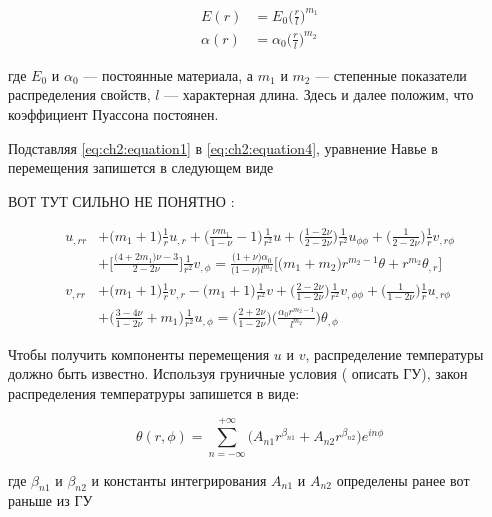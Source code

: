 \begin{equation}
	\label{eq:ch2:equation4}
	\begin{split}
		E(r) &= E_0 \big ( \frac{r}{l} \big) ^ {m_1} \\
		\alpha (r) &= \alpha_0 \big ( \frac{r}{l} \big) ^{ m_2}
	\end{split}
\end{equation}

где \(E_0\) и \(\alpha_0 \) --- постоянные материала, а \(m_1\) и \(m_2\) --- степенные показатели распределения свойств, \(l\) --- характерная длина. Здесь и далее положим,
что коэффициент Пуассона постоянен.

Подставляя \cref{eq:ch2:equation1} в \cref{eq:ch2:equation4}, уравнение Навье в перемещения запишется в следующем виде {\color{red} ВОТ ТУТ СИЛЬНО НЕ ПОНЯТНО :

\begin{equation}
	\label{eq:ch2:equation5}
	\begin{split}
		u_{,rr} &+ \big ( m_1+1\big ) \frac{1}{r} u_{,r} + \big ( \frac{\nu m_1}{1-\nu} -1 \big ) \frac{1}{r^2} u + \big ( \frac{1-2\nu}{2-2\nu} \big) \frac{1}{r^2} u_{\phi \phi} + \big ( \frac{1}{2-2\nu}\big ) \frac{1}{r} v_{,r \phi} \\
		&+ \big [ \frac{\big ( 4+2 m_1\big ) \nu -3 }{2-2\nu} \big ] \frac{1}{r^2} v_{, \phi} = \frac{\big ( 1+\nu\big ) \alpha_0 }{\big (1-\nu \big ) l^{m_2}} \Big [ \big (m_1 + m_2 \big ) r^{m_2 -1} \theta + r^{m_2} \theta_{,r}\Big] \\
		v_{,rr} &+ \big (m_1 +1 \big ) \frac{1}{r} v_{,r} - \big (m_1 + 1 \big ) \frac{1}{r^2} v + \big ( \frac{2-2\nu }{1-2\nu } \big ) \frac{1}{r^2} v_{,\phi \phi} + \big ( \frac{1}{1-2\nu} \big ) \frac{1}{r} u_{,r \phi} \\
		&+ \big ( \frac{3-4\nu}{1-2\nu} + m_1\big ) \frac{1}{r^2} u_{, \phi} = \big (\frac{2+2\nu}{1-2\nu} \big ) \big (\frac{\alpha_0 r^{m_2 -1}}{l^{m_2}} \big ) \theta_{,\phi}
	\end{split}
\end{equation}
}


Чтобы получить компоненты перемещения \(u\) и \(v\), распределение температуры должно быть известно. Используя груничные условия ({\color{red} описать ГУ}), закон распределения температруры запишется в виде:

\begin{equation}
	\label{eq:ch2:equation6}
	\theta(r, \phi) = \sum_{n=-\infty}^{+\infty} \big (A_{n1} r^{\beta_{n1}} + A_{n2} r^{\beta_{n2}} \big ) e^{in \phi}
\end{equation}

где \(\beta_{n1}\) и \(\beta_{n2}\) и константы интегрирования \(A_{n1}\) и \(A_{n2}\) определены ранее {\color{red} вот раньше из ГУ}